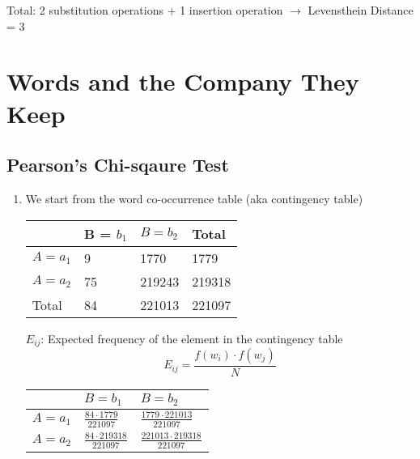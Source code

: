 \documentclass{article}
\begin{document}
	Total: 2 substitution operations + 1 insertion operation $\rightarrow$ Levensthein Distance = 3

\newpage
\section { Words and the Company They Keep }
	\subsection { Pearson's Chi-sqaure Test }
	\begin{enumerate}

	\item We start from the word co-occurrence table (aka contingency table)
	\begin{center}
	\begin{tabular} { | m{2cm} | m{2cm} | m{2cm} | m{2cm} | }
		\hline
		 & B = $b_1$ & $B = b_2$ & Total \\
		\hline
		$A = a_1$ & 9 & 1770 & 1779  \\
		\hline
		$A = a_2$ & 75 & 219243 & 219318 \\
		\hline
		Total & 84 & 221013 & 221097 \\
		\hline
	\end{tabular}
	\end{center}

	$E_{ij}$: Expected frequency of the element in the contingency table
	\begin{equation*}
		 E_{ij} = \frac{f(w_i) \cdot f(w_j)}{N}
	\end{equation*}

\renewcommand{\arraystretch}{1.5}

	\begin{center}
	\begin{tabular} { | m{2cm} | m{2cm} | m{2cm} |  }
		\hline
		 & $B = b_1$ & $B = b_2$ \\
		\hline
		$A = a_1$ & $\frac{84 \cdot 1779}{221097}$ & $\frac{1779 \cdot 221013}{221097}$ \\
		\hline
		$A = a_2$ & $\frac{84 \cdot 219318}{221097}$ & $\frac{221013 \cdot 219318}{221097}$ \\
		\hline
	\end{tabular}
	\end{center}


\end{enumerate}
\end{document}
